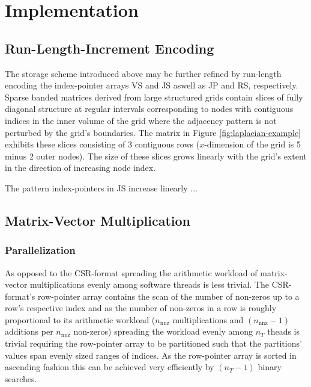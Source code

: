 \chapter{Implementation}

  \section{Run-Length-Increment Encoding}


    The storage scheme introduced above may be further refined by run-length encoding the index-pointer arrays VS and
    JS aswell as JP and RS, respectively. Sparse banded matrices derived from large structured grids contain slices of
    fully diagonal structure at regular intervals corresponding to nodes with contiguous indices in the inner volume
    of the grid where the adjacency pattern is not perturbed by the grid's boundaries. The matrix in Figure
    \ref{fig:laplacian-example} exhibits these slices consisting of 3 contiguous rows ($x$-dimension of the grid is 5
    minus 2 outer nodes). The size of these slices grows linearly with the grid's extent in the direction of
    increasing node index.

    The pattern index-pointers in JS increase linearly ...

  \section{Matrix-Vector Multiplication}

    \subsection{Parallelization}

      As opposed to the CSR-format spreading the arithmetic workload of matrix-vector multiplications evenly among
      software threads is less trivial. The CSR-format's row-pointer array contains the scan of the number of non-zeros
      up to a row's respective index and as the number of non-zeros in a row is roughly proportional to its arithmetic
      workload ($n_\text{nnz}$ multiplications and $(n_\text{nnz} - 1)$ additions per $n_\text{nnz}$ non-zeros)
      spreading the workload evenly among $n_T$ theads is trivial requiring the row-pointer array to be partitioned such
      that the partitions' values span evenly sized ranges of indices. As the row-pointer array is sorted in ascending
      fashion this can be achieved very efficiently by $(n_T - 1)$ binary searches.
